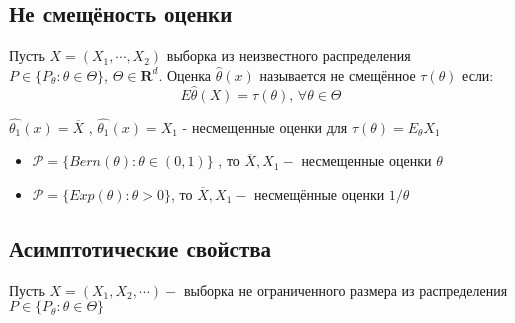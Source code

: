 \documentclass[11pt,fleqn]{book} %
\begin{document}
\subsection{Не смещёность оценки }
\begin{defi}
Пусть $X = (X_1 , \cdots , X_2) $ выборка из неизвестного распределения  \\ $P \in \{P_\theta : \theta \in \Theta\}$, $\Theta \in \mathbf{R}^d$. Оценка $\hat{\theta}(x)$ называется не смещённое $\tau(\theta)$ если: $$E\hat{\theta}(X) = \tau(\theta)\text{,  } \forall \theta \in \Theta$$
\end{defi}
\begin{exa}
$\hat{\theta_1}(x) = \overline{X}$ , $\hat{\theta_1}(x) = X_1$ - несмещенные оценки для $\tau(\theta) = E_\theta X_1$
\begin{itemize}
\item $\mathcal{P} = \{\textit{Bern}(\theta) : \theta \in (0,1)\}$ , то $\overline{X}, X_1 - $ несмещенные оценки $\theta$ 
\item $\mathcal{P} = \{\textit{Exp}(\theta) : \theta > 0\}$, то $\overline{X}, X_1 - $  несмещённые оценки $1 / \theta$ 
\end{itemize}
\end{exa}
\subsection{Асимптотические свойства}
Пусть $X = (X_1, X_2,  \cdots) - $ выборка не ограниченного размера из распределения $P \in  \{P_\theta : \theta \in \Theta\} $
\end{document}
